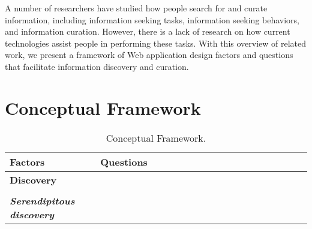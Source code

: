 \documentclass{casconpaper}
\begin{document}
{A number of researchers have studied how people search for and curate information, including information seeking tasks, information seeking behaviors, and information curation. However, there is a lack of research on how current technologies assist people in performing these tasks. With this overview of related work, we present a framework of Web application design factors and questions that facilitate information discovery and curation.
} %




{\section{Conceptual Framework}
\begin{table*}[htbp]
\caption{Conceptual Framework.}
\centering
\small
\begin{tabular}{|p{0.30\linewidth}|p{0.70\linewidth}|}
\hline
\textbf{\large{Factors}}   & \textbf{\large{Questions}}  \\
\hline
\textbf{\large{Discovery}}                     &                                                                                                           \\

&\\
\emph{\textbf{Serendipitous discovery}}     &                                                                                                           \\


\end{tabular}
\end{table*}}
\end{document}
